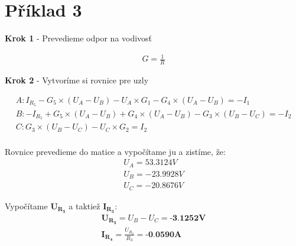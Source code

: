 \section{Příklad 3}

\begin{center}
    \textbf{Krok 1} - Prevedieme odpor na vodivosť
\end{center}

\begin{gather*}
    G = \frac{1}{R}
\end{gather*}

\begin{center}
    \textbf{Krok 2} - Vytvoríme si rovnice pre uzly
\end{center}
\begin{gather*}
    A: I_{R_{5}} - G_{5} \times (U_{A} - U_{B}) - U_{A} \times G_{1} - G_{4} \times (U_{A} - U_{B}) = -I_{1}\\
    B: -I_{R_{5}} + G_{5} \times (U_{A} - U_{B}) + G_{4} \times (U_{A} - U_{B}) - G_{3} \times (U_{B} - U_{C}) = -I_{2}\\
    C: G_{3} \times (U_{B} - U_{C}) - U_{C} \times G_{2} = I_{2}\\
\end{gather*}

Rovnice prevedieme do matice a vypočítame ju a zistíme, že:
\begin{gather*}
    U_A = 53.3124V\\
    U_B = -23.9928V \\
    U_C = -20.8676V
\end{gather*}

Vypočítame $\boldsymbol{U_{R_3}}$ a taktiež $\boldsymbol{I_{R_3}}$:
\begin{gather*}
    \boldsymbol{U_{R_3}} = U_B - U_C = \textbf{-3.1252V} \\
    \boldsymbol{I_{R_4}} = \frac{U_{R_3}}{R_3} = \textbf{-0.0590A}
\end{gather*}